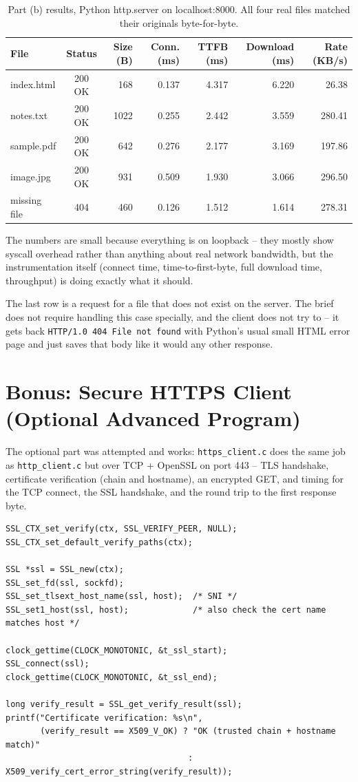 \documentclass[11pt,a4paper]{article}
\begin{document}
\begin{table}[H]
\centering
\footnotesize
\begin{tabular}{@{}lcrrrrr@{}}
\toprule
File & Status & Size (B) & Conn. (ms) & TTFB (ms) & Download (ms) & Rate (KB/s) \\
\midrule
index.html & 200 OK & 168 & 0.137 & 4.317 & 6.220 & 26.38 \\
notes.txt & 200 OK & 1022 & 0.255 & 2.442 & 3.559 & 280.41 \\
sample.pdf & 200 OK & 642 & 0.276 & 2.177 & 3.169 & 197.86 \\
image.jpg & 200 OK & 931 & 0.509 & 1.930 & 3.066 & 296.50 \\
missing file & 404 & 460 & 0.126 & 1.512 & 1.614 & 278.31 \\
\bottomrule
\end{tabular}
\caption{Part (b) results, Python http.server on localhost:8000. All four real files
matched their originals byte-for-byte.}
\end{table}

The numbers are small because everything is on loopback -- they mostly show syscall
overhead rather than anything about real network bandwidth, but the instrumentation
itself (connect time, time-to-first-byte, full download time, throughput) is doing
exactly what it should.

The last row is a request for a file that does not exist on the server. The brief
does not require handling this case specially, and the client does not try to -- it
gets back \texttt{HTTP/1.0 404 File not found} with Python's usual small HTML error
page and just saves that body like it would any other response.

\section*{Bonus: Secure HTTPS Client (Optional Advanced Program)}
The optional part was attempted and works: \texttt{https\_client.c} does the same job
as \texttt{http\_client.c} but over TCP + OpenSSL on port 443 -- TLS handshake,
certificate verification (chain and hostname), an encrypted GET, and timing for the
TCP connect, the SSL handshake, and the round trip to the first response byte.

\begin{lstlisting}[caption={Excerpt of https\_client.c -- TLS handshake and certificate verification}]
SSL_CTX_set_verify(ctx, SSL_VERIFY_PEER, NULL);
SSL_CTX_set_default_verify_paths(ctx);

SSL *ssl = SSL_new(ctx);
SSL_set_fd(ssl, sockfd);
SSL_set_tlsext_host_name(ssl, host);  /* SNI */
SSL_set1_host(ssl, host);             /* also check the cert name matches host */

clock_gettime(CLOCK_MONOTONIC, &t_ssl_start);
SSL_connect(ssl);
clock_gettime(CLOCK_MONOTONIC, &t_ssl_end);

long verify_result = SSL_get_verify_result(ssl);
printf("Certificate verification: %s\n",
       (verify_result == X509_V_OK) ? "OK (trusted chain + hostname match)"
                                     : X509_verify_cert_error_string(verify_result));
\end{lstlisting}
\end{document}

